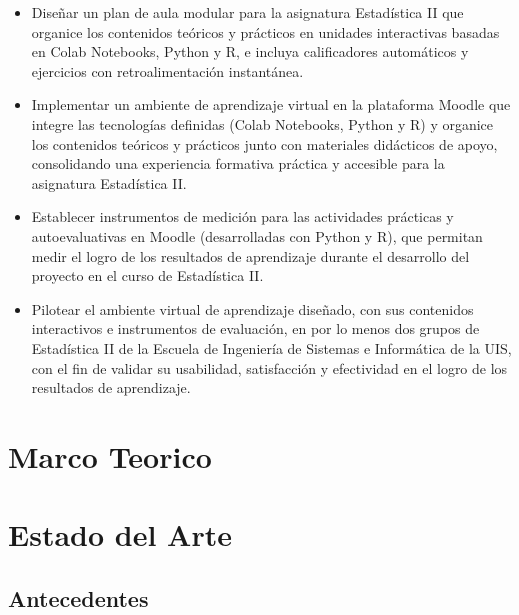 \documentclass[letter,oneside,12pt,spanish]{report}
\begin{document}
\begin{itemize}
    \item Diseñar un plan de aula modular para la asignatura Estadística II que organice los contenidos teóricos y prácticos en unidades interactivas basadas en Colab Notebooks, Python y R, e incluya calificadores automáticos y ejercicios con retroalimentación instantánea.
    
    \item Implementar un ambiente de aprendizaje virtual en la plataforma Moodle que integre las tecnologías definidas (Colab Notebooks, Python y R) y organice los contenidos teóricos y prácticos junto con materiales didácticos de apoyo, consolidando una experiencia formativa práctica y accesible para la asignatura Estadística II.
    
    \item Establecer instrumentos de medición para las actividades prácticas y autoevaluativas en Moodle (desarrolladas con Python y R), que permitan medir el logro de los resultados de aprendizaje durante el desarrollo del proyecto en el curso de Estadística II.

    \item Pilotear el ambiente virtual de aprendizaje diseñado, con sus contenidos interactivos e instrumentos de evaluación, en por lo menos dos grupos de Estadística II de la Escuela de Ingeniería de Sistemas e Informática de la UIS, con el fin de validar su usabilidad, satisfacción y efectividad en el logro de los resultados de aprendizaje.

\end{itemize}


\newpage

\chapter{Marco Teorico}


\newpage


\chapter{Estado del Arte}

\section{Antecedentes}
\end{document}
